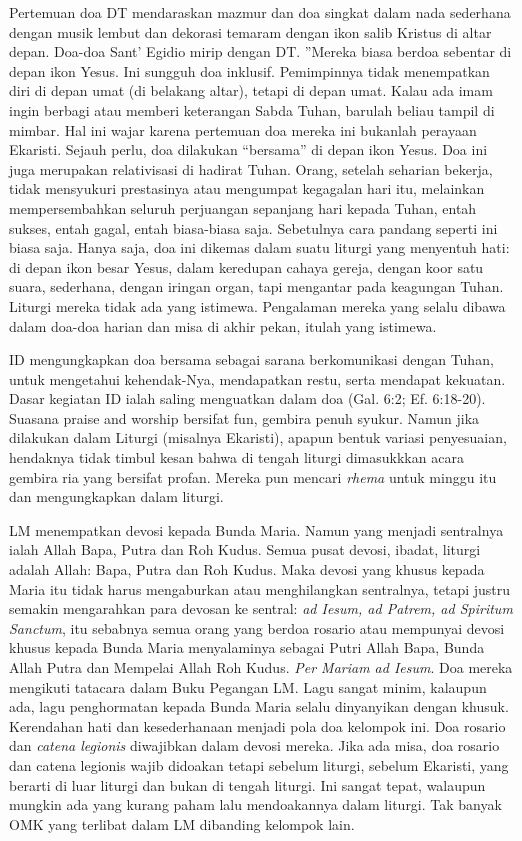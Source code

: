 Pertemuan doa  DT mendaraskan mazmur dan doa singkat dalam nada sederhana dengan musik lembut dan dekorasi temaram dengan ikon salib Kristus di altar depan. Doa-doa  Sant’ Egidio mirip dengan DT. ”Mereka biasa berdoa sebentar di depan ikon Yesus. Ini sungguh doa inklusif. Pemimpinnya tidak menempatkan diri di depan umat (di belakang altar), tetapi di depan umat. Kalau ada imam ingin berbagi atau memberi keterangan Sabda Tuhan, barulah beliau tampil di mimbar. Hal ini wajar karena pertemuan doa mereka ini bukanlah perayaan Ekaristi.  Sejauh perlu, doa dilakukan “bersama” di depan ikon Yesus. Doa ini juga merupakan relativisasi di hadirat Tuhan. Orang, setelah seharian bekerja, tidak mensyukuri prestasinya atau mengumpat kegagalan hari itu, melainkan mempersembahkan seluruh perjuangan sepanjang hari kepada Tuhan, entah sukses, entah gagal, entah biasa-biasa saja. Sebetulnya cara pandang seperti ini biasa saja. Hanya saja, doa ini dikemas dalam suatu liturgi yang menyentuh hati: di depan ikon besar Yesus, dalam keredupan cahaya gereja, dengan koor satu suara, sederhana, dengan iringan organ, tapi mengantar pada keagungan Tuhan. Liturgi mereka tidak ada yang istimewa. Pengalaman mereka yang selalu dibawa dalam doa-doa harian dan misa di akhir pekan, itulah yang istimewa.

ID mengungkapkan doa bersama sebagai sarana berkomunikasi dengan Tuhan, untuk mengetahui kehendak-Nya, mendapatkan restu, serta mendapat kekuatan. Dasar kegiatan ID ialah saling menguatkan dalam doa (Gal. 6:2; Ef. 6:18-20). Suasana praise and  worship bersifat fun, gembira penuh syukur. Namun jika dilakukan dalam Liturgi (misalnya Ekaristi), apapun bentuk variasi penyesuaian, hendaknya tidak timbul kesan bahwa di tengah liturgi dimasukkkan acara gembira ria yang bersifat profan.  Mereka pun mencari \textit{rhema} untuk minggu itu dan mengungkapkan dalam liturgi.

LM menempatkan devosi kepada Bunda Maria. Namun yang menjadi sentralnya ialah Allah Bapa, Putra dan Roh Kudus.  Semua pusat devosi, ibadat, liturgi adalah Allah: Bapa, Putra dan Roh Kudus. Maka devosi yang khusus kepada Maria itu tidak harus mengaburkan atau menghilangkan sentralnya, tetapi justru semakin mengarahkan para devosan ke sentral: \textit{ad Iesum, ad Patrem, ad Spiritum Sanctum}, itu sebabnya semua orang yang berdoa rosario atau mempunyai devosi khusus kepada Bunda Maria menyalaminya sebagai Putri Allah Bapa, Bunda Allah Putra dan Mempelai Allah Roh Kudus. \textit{Per Mariam ad Iesum}.  Doa  mereka mengikuti tatacara dalam Buku Pegangan LM. Lagu sangat minim, kalaupun ada,  lagu penghormatan kepada Bunda Maria selalu dinyanyikan dengan khusuk. Kerendahan hati dan kesederhanaan menjadi pola doa  kelompok ini. Doa rosario dan \textit{catena legionis} diwajibkan dalam devosi mereka. Jika ada misa, doa rosario dan catena legionis wajib didoakan tetapi sebelum liturgi, sebelum Ekaristi, yang berarti di luar liturgi dan bukan di tengah liturgi. Ini sangat tepat, walaupun mungkin ada yang kurang paham lalu mendoakannya dalam liturgi. Tak banyak OMK yang terlibat dalam LM dibanding kelompok lain.

